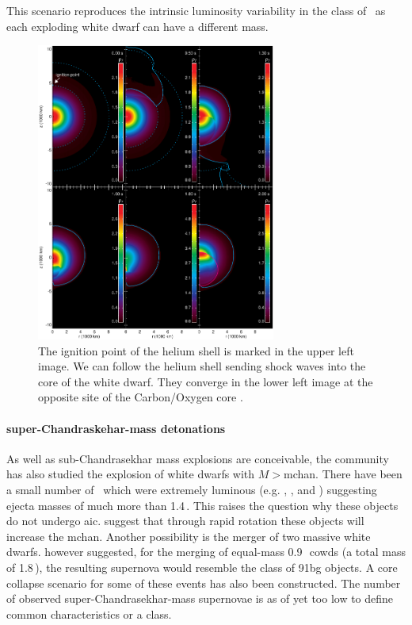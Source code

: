 This scenario reproduces the intrinsic luminosity variability in the class of \snia\ as each exploding white dwarf can have a different mass. 

\begin{figure}[htbp] %
   \centering
   \includegraphics[width=0.7\textwidth]{chapter_intro/plots/fink2010.pdf} 
   \caption[Helium shell ignition leading to sub-Chandrasekhar mass detonation]{The ignition point of the helium shell is marked in the upper left image. We can follow the helium shell sending shock waves into the core of the white dwarf. They converge in the lower left image at the opposite site of the Carbon/Oxygen core \citep[data from][Figure kindly provided by Michael Fink]{2010A&A...514A..53F}. }
   \label{fig:subch_fink2010}
\end{figure}

\paragraph{super-Chandraskehar-mass detonations}
As well as sub-Chandrasekhar mass explosions are conceivable, the community has also studied the explosion of white dwarfs with $M>$\gls{mchan}. There have been a small number of \sneia\ which were extremely luminous (e.g. , ,  and ) suggesting ejecta masses of much more than 1.4\,\msun. This raises the question why these objects do not undergo \gls{aic}.  \cite{2005A&A...435..967Y} suggest that through rapid rotation these objects will increase the \gls{mchan}. Another possibility is the merger of two massive white dwarfs. \citet{2010Natur.463...61P} however suggested, for the merging of equal-mass 0.9\,\msun\ \glspl{cowd} (a total mass of 1.8\,\msun), the resulting supernova would resemble the class of \gls{91bg} objects. A core collapse scenario for some of these events has also been constructed. The number of observed super-Chandrasekhar-mass supernovae is as of yet too low to define common characteristics or a class.



